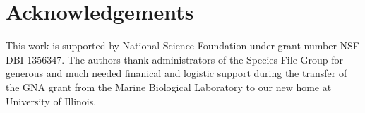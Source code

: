 \documentclass{bmcart}
\begin{document}
\section*{Acknowledgements}

This work is supported by National Science Foundation under grant number NSF
DBI-1356347. The authors thank administrators of the Species File Group for
generous and much needed finanical and logistic support during the transfer of
the GNA grant from the Marine Biological Laboratory to our new home at
University of Illinois.


\end{document}
